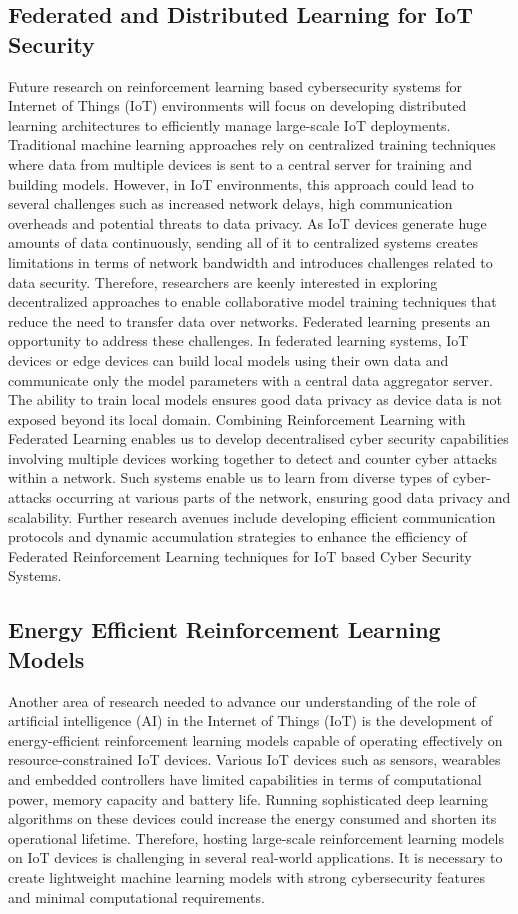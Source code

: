 \documentclass[12pt]{article}
\begin{document}
	\subsection{Federated and Distributed Learning for IoT Security}
    Future research on reinforcement learning based cybersecurity systems for Internet of Things (IoT) environments will focus on developing distributed learning architectures to efficiently manage large-scale IoT deployments. Traditional machine learning approaches rely on centralized training techniques where data from multiple devices is sent to a central server for training and building models. However, in IoT environments, this approach could lead to several challenges such as increased network delays, high communication overheads and potential threats to data privacy. As IoT devices generate huge amounts of data continuously, sending all of it to centralized systems creates limitations in terms of network bandwidth and introduces challenges related to data security. Therefore, researchers are keenly interested in exploring decentralized approaches to enable collaborative model training techniques that reduce the need to transfer data over networks. 
Federated learning presents an opportunity to address these challenges. In federated learning systems, IoT devices or edge devices can build local models using their own data and communicate only the model parameters with a central data aggregator server. The ability to train local models ensures good data privacy as device data is not exposed beyond its local domain. Combining Reinforcement Learning with Federated Learning enables us to develop decentralised cyber security capabilities involving multiple devices working together to detect and counter cyber attacks within a network. Such systems enable us to learn from diverse types of cyber-attacks occurring at various parts of the network, ensuring good data privacy and scalability. Further research avenues include developing efficient communication protocols and dynamic accumulation strategies to enhance the efficiency of Federated Reinforcement Learning techniques for IoT based Cyber Security Systems.\cite{Jamshidi2025, Wang2023, Patel2024}
\subsection{Energy Efficient Reinforcement Learning Models}
Another area of research needed to advance our understanding of the role of artificial intelligence (AI) in the Internet of Things (IoT) is the development of energy-efficient reinforcement learning models capable of operating effectively on resource-constrained IoT devices. Various IoT devices such as sensors, wearables and embedded controllers have limited capabilities in terms of computational power, memory capacity and battery life. Running sophisticated deep learning algorithms on these devices could increase the energy consumed and shorten its operational lifetime. Therefore, hosting large-scale reinforcement learning models on IoT devices is challenging in several real-world applications. It is necessary to create lightweight machine learning models with strong cybersecurity features and minimal computational requirements. 
\end{document}
